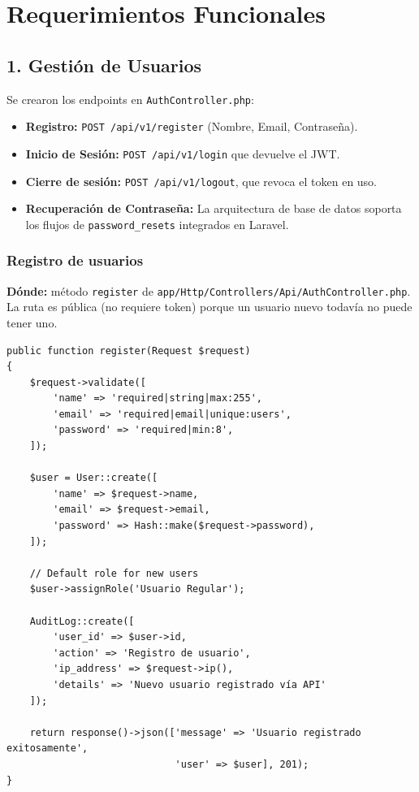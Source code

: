 \section{Requerimientos Funcionales}

\subsection{1. Gestión de Usuarios}
Se crearon los endpoints en \texttt{AuthController.php}:
\begin{itemize}
    \item \textbf{Registro:} \texttt{POST /api/v1/register} (Nombre, Email, Contraseña).
    \item \textbf{Inicio de Sesión:} \texttt{POST /api/v1/login} que devuelve el JWT.
    \item \textbf{Cierre de sesión:} \texttt{POST /api/v1/logout}, que revoca el token en uso.
    \item \textbf{Recuperación de Contraseña:} La arquitectura de base de datos soporta los flujos de \texttt{password\_resets} integrados en Laravel.
\end{itemize}

\subsubsection{Registro de usuarios}
\textbf{Dónde:} método \texttt{register} de \texttt{app/Http/Controllers/Api/AuthController.php}. La ruta es pública (no requiere token) porque un usuario nuevo todavía no puede tener uno.

\begin{lstlisting}[caption={AuthController::register}]
public function register(Request $request)
{
    $request->validate([
        'name' => 'required|string|max:255',
        'email' => 'required|email|unique:users',
        'password' => 'required|min:8',
    ]);

    $user = User::create([
        'name' => $request->name,
        'email' => $request->email,
        'password' => Hash::make($request->password),
    ]);

    // Default role for new users
    $user->assignRole('Usuario Regular');

    AuditLog::create([
        'user_id' => $user->id,
        'action' => 'Registro de usuario',
        'ip_address' => $request->ip(),
        'details' => 'Nuevo usuario registrado vía API'
    ]);

    return response()->json(['message' => 'Usuario registrado exitosamente',
                             'user' => $user], 201);
}
\end{lstlisting}

